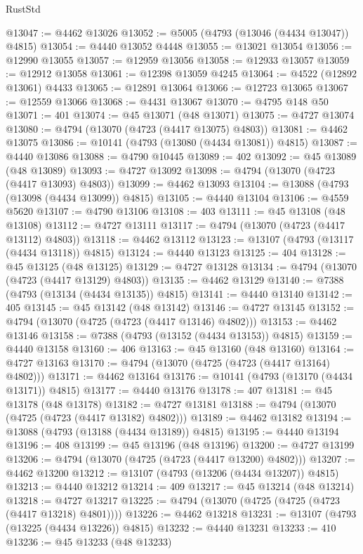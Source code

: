 \begin{lexlean}{RustStd}
\begin{coremodule}
@13047 := @4462 @13026
@13052 := @5005 (@4793 (@13046 (@4434 @13047)) @4815)
@13054 := @4440 @13052 @4448
@13055 := @13021 @13054
@13056 := @12990 @13055
@13057 := @12959 @13056
@13058 := @12933 @13057
@13059 := @12912 @13058
@13061 := @12398 @13059 @4245
@13064 := @4522 (@12892 @13061) @4433
@13065 := @12891 @13064
@13066 := @12723 @13065
@13067 := @12559 @13066
@13068 := @4431 @13067
@13070 := @4795 @148 @50
@13071 := 401
@13074 := @45 @13071 (@48 @13071)
@13075 := @4727 @13074
@13080 := @4794 (@13070 (@4723 (@4417 @13075) @4803))
@13081 := @4462 @13075
@13086 := @10141 (@4793 (@13080 (@4434 @13081)) @4815)
@13087 := @4440 @13086
@13088 := @4790 @10445
@13089 := 402
@13092 := @45 @13089 (@48 @13089)
@13093 := @4727 @13092
@13098 := @4794 (@13070 (@4723 (@4417 @13093) @4803))
@13099 := @4462 @13093
@13104 := @13088 (@4793 (@13098 (@4434 @13099)) @4815)
@13105 := @4440 @13104
@13106 := @4559 @5620
@13107 := @4790 @13106
@13108 := 403
@13111 := @45 @13108 (@48 @13108)
@13112 := @4727 @13111
@13117 := @4794 (@13070 (@4723 (@4417 @13112) @4803))
@13118 := @4462 @13112
@13123 := @13107 (@4793 (@13117 (@4434 @13118)) @4815)
@13124 := @4440 @13123
@13125 := 404
@13128 := @45 @13125 (@48 @13125)
@13129 := @4727 @13128
@13134 := @4794 (@13070 (@4723 (@4417 @13129) @4803))
@13135 := @4462 @13129
@13140 := @7388 (@4793 (@13134 (@4434 @13135)) @4815)
@13141 := @4440 @13140
@13142 := 405
@13145 := @45 @13142 (@48 @13142)
@13146 := @4727 @13145
@13152 := @4794 (@13070 (@4725 (@4723 (@4417 @13146) @4802)))
@13153 := @4462 @13146
@13158 := @7388 (@4793 (@13152 (@4434 @13153)) @4815)
@13159 := @4440 @13158
@13160 := 406
@13163 := @45 @13160 (@48 @13160)
@13164 := @4727 @13163
@13170 := @4794 (@13070 (@4725 (@4723 (@4417 @13164) @4802)))
@13171 := @4462 @13164
@13176 := @10141 (@4793 (@13170 (@4434 @13171)) @4815)
@13177 := @4440 @13176
@13178 := 407
@13181 := @45 @13178 (@48 @13178)
@13182 := @4727 @13181
@13188 := @4794 (@13070 (@4725 (@4723 (@4417 @13182) @4802)))
@13189 := @4462 @13182
@13194 := @13088 (@4793 (@13188 (@4434 @13189)) @4815)
@13195 := @4440 @13194
@13196 := 408
@13199 := @45 @13196 (@48 @13196)
@13200 := @4727 @13199
@13206 := @4794 (@13070 (@4725 (@4723 (@4417 @13200) @4802)))
@13207 := @4462 @13200
@13212 := @13107 (@4793 (@13206 (@4434 @13207)) @4815)
@13213 := @4440 @13212
@13214 := 409
@13217 := @45 @13214 (@48 @13214)
@13218 := @4727 @13217
@13225 := @4794 (@13070 (@4725 (@4725 (@4723 (@4417 @13218) @4801))))
@13226 := @4462 @13218
@13231 := @13107 (@4793 (@13225 (@4434 @13226)) @4815)
@13232 := @4440 @13231
@13233 := 410
@13236 := @45 @13233 (@48 @13233)

\end{coremodule}
\end{lexlean}
